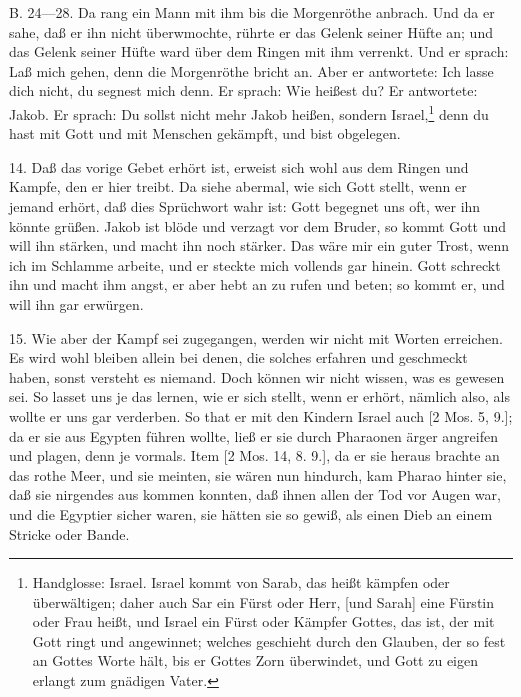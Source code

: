 B. 24—28. Da rang ein Mann mit ihm bis die Morgenröthe anbrach. Und da er sahe, daß er ihn nicht überwmochte, rührte er das Gelenk seiner Hüfte an; und das Gelenk seiner Hüfte ward über dem Ringen mit ihm verrenkt. Und er sprach: Laß mich gehen, denn die Morgenröthe bricht an. Aber er antwortete: Ich lasse dich nicht, du segnest mich denn. Er sprach: Wie heißest du? Er antwortete: Jakob. Er sprach: Du sollst nicht mehr Jakob heißen, sondern Israel,\footnote{Handglosse: Israel. Israel kommt von Sarab, das heißt kämpfen oder überwältigen; daher auch Sar ein Fürst oder Herr, [und Sarah] eine Fürstin oder Frau heißt, und Israel ein Fürst oder Kämpfer Gottes, das ist, der mit Gott ringt und angewinnet; welches geschieht durch den Glauben, der so fest an Gottes Worte hält, bis er Gottes Zorn überwindet, und Gott zu eigen erlangt zum gnädigen Vater.} denn du hast mit Gott und mit Menschen gekämpft, und bist obgelegen.

14. Daß das vorige Gebet erhört ist, erweist sich wohl aus dem Ringen und Kampfe, den er hier treibt. Da siehe abermal, wie sich Gott stellt, wenn er jemand erhört, daß dies Sprüchwort wahr ist: Gott begegnet uns oft, wer ihn könnte grüßen. Jakob ist blöde und verzagt vor dem Bruder, so kommt Gott und will ihn stärken, und macht ihn noch stärker. Das wäre mir ein guter Trost, wenn ich im Schlamme arbeite, und er steckte mich vollends gar hinein. Gott schreckt ihn und macht ihm angst, er aber hebt an zu rufen und beten; so kommt er, und will ihn gar erwürgen.

15. Wie aber der Kampf sei zugegangen, werden wir nicht mit Worten erreichen. Es wird wohl bleiben allein bei denen, die solches erfahren und geschmeckt haben, sonst versteht es niemand. Doch können wir nicht wissen, was es gewesen sei. So lasset uns je das lernen, wie er sich stellt, wenn er erhört, nämlich also, als wollte er uns gar verderben. So that er mit den Kindern Israel auch [2 Mos. 5, 9.]; da er sie aus Egypten führen wollte, ließ er sie durch Pharaonen ärger angreifen und plagen, denn je vormals. Item [2 Mos. 14, 8. 9.], da er sie heraus brachte an das rothe Meer, und sie meinten, sie wären nun hindurch, kam Pharao hinter sie, daß sie nirgendes aus kommen konnten, daß ihnen allen der Tod vor Augen war, und die Egyptier sicher waren, sie hätten sie so gewiß, als einen Dieb an einem Stricke oder Bande.


